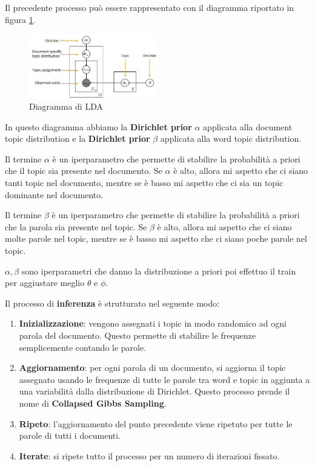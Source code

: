 Il precedente processo può essere rappresentato con il diagramma riportato in
figura \ref{fig:lda}.
\begin{figure}[!ht]
      \centering
      \includegraphics[width=0.5\textwidth]{./img/nlp/lda.png}
      \caption{Diagramma di LDA}
      \label{fig:lda}
\end{figure}

In questo diagramma abbiamo la \textbf{Dirichlet prior} $\alpha$ applicata alla
document topic distribution e la \textbf{Dirichlet prior} $\beta$ applicata alla
word topic distribution.

Il termine $\alpha$ è un iperparametro che permette di stabilire la probabilità
a priori che il topic sia presente nel documento. Se $\alpha$ è alto, allora mi
aspetto che ci siano tanti topic nel documento, mentre se è basso mi aspetto che
ci sia un topic dominante nel documento.

Il termine $\beta$ è un iperparametro che permette di stabilire la probabilità
a priori che la parola sia presente nel topic. Se $\beta$ è alto, allora mi aspetto
che ci siano molte parole nel topic, mentre se è basso mi aspetto che ci siano
poche parole nel topic.

$\alpha, \beta$ sono iperparametri che danno la distribuzione a priori poi effettuo
il train per aggiustare meglio $\theta$ e $\phi$.

Il processo di \textbf{inferenza} è strutturato nel seguente modo:
\begin{enumerate}
      \item \textbf{Inizializzazione}: vengono assegnati i topic in modo randomico
            ad ogni parola del documento. Questo permette di stabilire le
            frequenze semplicemente contando le parole.
      \item \textbf{Aggiornamento}: per ogni parola di un documento, si aggiorna
            il topic assegnato usando le frequenze di tutte le parole tra word e
            topic in aggiunta a una variabilità dalla distribuzione di Dirichlet.
            Questo processo prende il nome di \textbf{Collapsed Gibbs Sampling}.
      \item \textbf{Ripeto}: l'aggiornamento del punto precedente viene ripetuto
            per tutte le parole di tutti i documenti.
      \item \textbf{Iterate}: si ripete tutto il processo per un numero di iterazioni
            fissato.
\end{enumerate}

